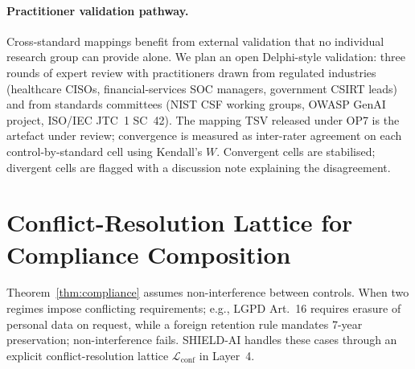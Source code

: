 \documentclass[preprint,12pt,authoryear]{elsarticle}
\begin{document}
\paragraph{Practitioner validation pathway.}
Cross-standard mappings benefit from external validation that no individual research group can provide alone. We plan an open Delphi-style validation: three rounds of expert review with practitioners drawn from regulated industries (healthcare CISOs, financial-services SOC managers, government CSIRT leads) and from standards committees (NIST CSF working groups, OWASP GenAI project, ISO/IEC JTC~1 SC~42). The mapping TSV released under OP7 is the artefact under review; convergence is measured as inter-rater agreement on each control-by-standard cell using Kendall's $W$. Convergent cells are stabilised; divergent cells are flagged with a discussion note explaining the disagreement.

\section{Conflict-Resolution Lattice for Compliance Composition}
\label{app:conflict}
Theorem~\ref{thm:compliance} assumes non-interference between controls. When two regimes impose conflicting requirements; e.g., LGPD Art.~16 requires erasure of personal data on request, while a foreign retention rule mandates 7-year preservation; non-interference fails. SHIELD-AI handles these cases through an explicit conflict-resolution lattice $\mathcal{L}_{\text{conf}}$ in Layer~4.
\end{document}
